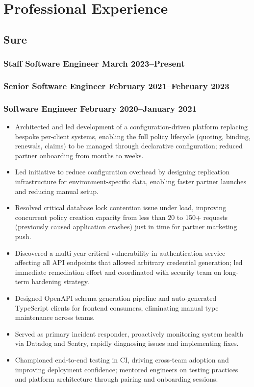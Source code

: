 \documentclass{article}
\begin{document}
\begin{minipage}[t]{.6\textwidth}
	\section*{Professional Experience}
	\subsection*{Sure}
	\subsubsection*{Staff Software Engineer \hfill March 2023--Present}
	\subsubsection*{Senior Software Engineer \hfill February 2021--February 2023}
	\subsubsection*{Software Engineer \hfill February 2020--January 2021}
	\begin{itemize}
		\item Architected and led development of a configuration-driven platform
		      replacing bespoke per-client systems, enabling the full policy lifecycle
		      (quoting, binding, renewals, claims) to be managed through declarative
		      configuration; reduced partner onboarding from months to weeks.
		\item Led initiative to reduce configuration overhead by designing
		      replication infrastructure for environment-specific data, enabling
		      faster partner launches and reducing manual setup.
		\item Resolved critical database lock contention issue under load,
		      improving concurrent policy creation capacity from less than 20
		      to 150+ requests (previously caused application crashes) just in
		      time for partner marketing push.
		\item Discovered a multi-year critical vulnerability in authentication
		      service affecting all API endpoints that allowed arbitrary credential
		      generation; led immediate remediation effort and coordinated with
		      security team on long-term hardening strategy.
		\item Designed OpenAPI schema generation pipeline and auto-generated
		      TypeScript clients for frontend consumers, eliminating manual type maintenance
		      across teams.
		\item Served as primary incident responder, proactively monitoring
		      system health via Datadog and Sentry, rapidly diagnosing issues and
		      implementing fixes.
		\item Championed end-to-end testing in CI, driving cross-team adoption
		      and improving deployment confidence; mentored engineers on testing
		      practices and platform architecture through pairing and onboarding sessions.
	\end{itemize}

\end{minipage}
\end{document}

